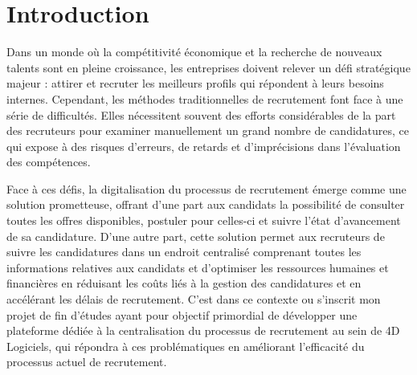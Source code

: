 \chapter*{Introduction}

Dans un monde où la compétitivité économique et la recherche 
de nouveaux talents sont en pleine croissance, les 
entreprises doivent relever un défi stratégique majeur : 
attirer et recruter les meilleurs profils qui répondent à 
leurs besoins internes. Cependant, les méthodes 
traditionnelles de recrutement font face à une série de 
difficultés. Elles nécessitent souvent des efforts 
considérables de la part des recruteurs pour examiner 
manuellement un grand nombre de candidatures, ce qui expose 
à des risques d'erreurs, de retards et d'imprécisions dans 
l'évaluation des compétences. 
\newline

Face à ces défis, la digitalisation du processus de recrutement émerge comme une
solution prometteuse, offrant d’une part aux candidats la possibilité de consulter toutes les
offres disponibles, postuler pour celles-ci et suivre l’état d’avancement de sa candidature.
D’une autre part, cette solution permet aux recruteurs de suivre les candidatures dans un endroit centralisé
comprenant toutes les informations relatives aux candidats et d’optimiser les ressources humaines et financières en réduisant les coûts
liés à la gestion des candidatures et en accélérant les délais de recrutement. C’est dans
ce contexte ou s’inscrit mon projet de fin d’études ayant pour objectif primordial de développer une plateforme dédiée à la centralisation
du processus de recrutement au sein de 4D Logiciels, qui répondra à ces
problématiques en améliorant l’efficacité du processus actuel de recrutement.  
\newline


